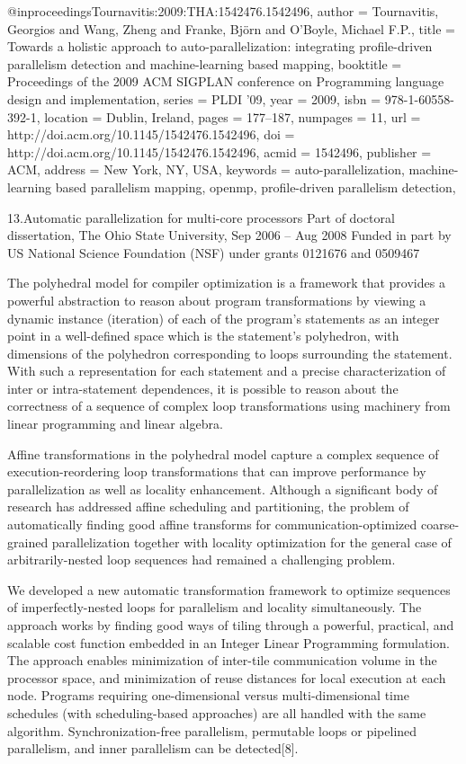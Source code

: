 @inproceedings{Tournavitis:2009:THA:1542476.1542496,
    author = {Tournavitis, Georgios and Wang, Zheng and Franke, Bj\"{o}rn and O'Boyle, Michael F.P.},
    title = {Towards a holistic approach to auto-parallelization: integrating profile-driven parallelism detection and machine-learning based mapping},
    booktitle = {Proceedings of the 2009 ACM SIGPLAN conference on Programming language design and implementation},
    series = {PLDI '09},
    year = {2009},
    isbn = {978-1-60558-392-1},
    location = {Dublin, Ireland},
    pages = {177--187},
    numpages = {11},
    url = {http://doi.acm.org/10.1145/1542476.1542496},
    doi = {http://doi.acm.org/10.1145/1542476.1542496},
    acmid = {1542496},
    publisher = {ACM},
    address = {New York, NY, USA},
    keywords = {auto-parallelization, machine-learning based parallelism mapping, openmp, profile-driven parallelism detection},
} 


13.Automatic parallelization for multi-core processors
Part of doctoral dissertation, The Ohio State University, Sep 
2006 -- Aug 2008
Funded in part by US National Science Foundation (NSF) under 
grants 0121676 and 0509467

The polyhedral model for compiler optimization is a framework that 
provides a powerful abstraction to reason about program transformations 
by viewing a dynamic instance (iteration) of each of the program's 
statements as an integer point in a well-defined space which is the 
statement's  polyhedron, with dimensions of the polyhedron corresponding 
to loops surrounding the statement. With such a representation for each 
statement and a precise characterization of inter or intra-statement 
dependences, it is possible to reason about the correctness of a sequence 
of complex loop transformations using machinery from linear programming 
and linear algebra.

Affine transformations in the polyhedral model capture a complex 
sequence of execution-reordering loop transformations that can improve 
performance by parallelization as well as locality enhancement. Although 
a significant body of research has addressed affine scheduling and 
partitioning, the problem of automatically finding good affine transforms 
for communication-optimized coarse-grained parallelization together with 
locality optimization for the general case of arbitrarily-nested loop 
sequences had remained a challenging problem.

We developed a new automatic transformation framework to
optimize sequences of imperfectly-nested loops for parallelism and 
locality simultaneously. The approach works by finding good ways of 
tiling through a powerful, practical, and scalable cost function embedded 
in an Integer Linear Programming formulation. The approach enables 
minimization of inter-tile communication volume in the processor space, 
             and minimization of reuse distances for local execution at each node.  
             Programs requiring one-dimensional versus multi-dimensional time 
             schedules (with scheduling-based approaches) are all handled with the 
             same algorithm.  Synchronization-free parallelism, permutable loops 
             or pipelined parallelism, and inner parallelism can be detected[8].


